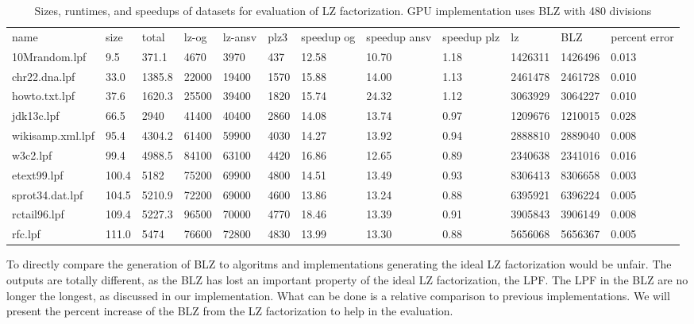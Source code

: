 \begin{table}[h]
\begin{tabular}{llllllllllll}
name             & size  & total  & lz-og & lz-ansv & plz3 & speedup og & speedup ansv & speedup plz & lz      & BLZ     & percent error \\
10Mrandom.lpf    & 9.5   & 371.1  & 4670  & 3970    & 437  & 12.58      & 10.70        & 1.18        & 1426311 & 1426496 & 0.013         \\
chr22.dna.lpf    & 33.0  & 1385.8 & 22000 & 19400   & 1570 & 15.88      & 14.00        & 1.13        & 2461478 & 2461728 & 0.010         \\
howto.txt.lpf    & 37.6  & 1620.3 & 25500 & 39400   & 1820 & 15.74      & 24.32        & 1.12        & 3063929 & 3064227 & 0.010         \\
jdk13c.lpf       & 66.5  & 2940   & 41400 & 40400   & 2860 & 14.08      & 13.74        & 0.97        & 1209676 & 1210015 & 0.028         \\
wikisamp.xml.lpf & 95.4  & 4304.2 & 61400 & 59900   & 4030 & 14.27      & 13.92        & 0.94        & 2888810 & 2889040 & 0.008         \\
w3c2.lpf         & 99.4  & 4988.5 & 84100 & 63100   & 4420 & 16.86      & 12.65        & 0.89        & 2340638 & 2341016 & 0.016         \\
etext99.lpf      & 100.4 & 5182   & 75200 & 69900   & 4800 & 14.51      & 13.49        & 0.93        & 8306413 & 8306658 & 0.003         \\
sprot34.dat.lpf  & 104.5 & 5210.9 & 72200 & 69000   & 4600 & 13.86      & 13.24        & 0.88        & 6395921 & 6396224 & 0.005         \\
rctail96.lpf     & 109.4 & 5227.3 & 96500 & 70000   & 4770 & 18.46      & 13.39        & 0.91        & 3905843 & 3906149 & 0.008         \\
rfc.lpf          & 111.0 & 5474   & 76600 & 72800   & 4830 & 13.99      & 13.30        & 0.88        & 5656068 & 5656367 & 0.005        
\end{tabular}
\caption{Sizes, runtimes, and speedups of datasets for evaluation of LZ factorization. GPU implementation uses BLZ with 480 divisions}
\label{tab:lzdata}
\end{table}

To directly compare the generation of BLZ to algoritms and implementations generating the ideal LZ factorization would be unfair.
The outputs are totally different, as the BLZ has lost an important property of the ideal LZ factorization, the LPF.
The LPF in the BLZ are no longer the longest, as discussed in our implementation.
What can be done is a relative comparison to previous implementations.
We will present the percent increase of the BLZ from the LZ factorization to help in the evaluation.

